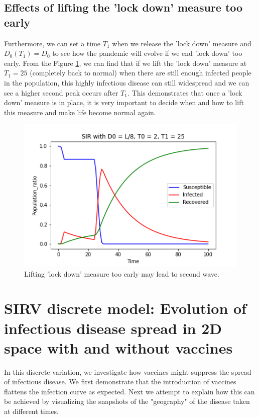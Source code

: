 \documentclass[12pt, reqno]{amsart}
\begin{document}
    \subsection{Effects of lifting the 'lock down' measure too early}
    Furthermore, we can set a time $T_1$ when we release the 'lock down' measure and $D_0(T_1) = D_0$ to see how the pandemic will evolve if we end 'lock down' too early. From the Figure \ref{fig:T1}, we can find that if we lift the 'lock down' measure at $T_1 = 25$ (completely back to normal) when there are still enough infected people in the population, this highly infectious disease can still widespread and we can see a higher second peak occurs after $T_1$. This demonstrates that once a 'lock down' measure is in place, it is very important to decide when and how to lift this measure and make life become normal again.

        \begin{figure}[h]
        \centering
        \includegraphics[scale=0.45]{./discrete/sir_discrete_grid14.png}
        \caption{Lifting 'lock down' measure too early may lead to second wave.}
        \label{fig:T1}
    \end{figure}
    
    \section{SIRV discrete model: Evolution of infectious disease spread in 2D space with and without vaccines}\label{section:vaccine}
    
    In this discrete variation, we investigate how vaccines might suppress the spread of infectious disease. We first demonstrate that the introduction of vaccines flattens the infection curve as expected. Next we attempt to explain how this can be achieved by visualizing the snapshots of the "geography" of the disease taken at different times.    
    
\end{document}
